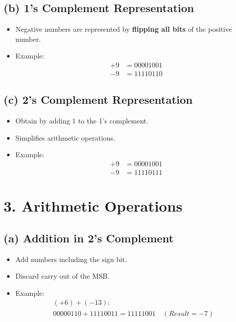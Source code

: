 \documentclass[a4paper,12pt]{article}
\begin{document}
\subsection*{(b) 1's Complement Representation}
\begin{itemize}
    \item Negative numbers are represented by \textbf{flipping all bits} of the positive number.
    \item Example:
    \begin{align*}
        +9 & = 00001001 \\
        -9 & = 11110110
    \end{align*}
\end{itemize}

\subsection*{(c) 2's Complement Representation}
\begin{itemize}
    \item Obtain by adding $1$ to the 1's complement.
    \item Simplifies arithmetic operations.
    \item Example:
    \begin{align*}
        +9 & = 00001001 \\
        -9 & = 11110111
    \end{align*}
\end{itemize}

\section*{3. Arithmetic Operations}

\subsection*{(a) Addition in 2's Complement}
\begin{itemize}
    \item Add numbers including the sign bit.
    \item Discard carry out of the MSB.
    \item Example:
    \begin{align*}
        (+6) + (-13): & \\
        00000110 + 11110011 = 11111001 \quad (Result = -7)
    \end{align*}
\end{itemize}
\end{document}
